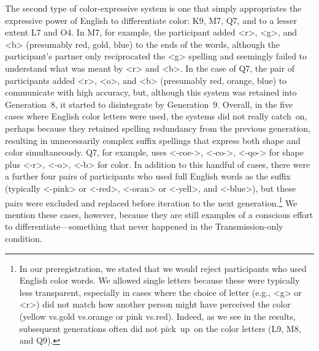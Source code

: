 \documentclass[doc,biblatex]{apa7}
\begin{document}
The second type of color-expressive system is one that simply appropriates the expressive power of English to differentiate color: K9, M7, Q7, and to a lesser extent L7 and O4. In M7, for example, the participant added <r>, <g>, and <b> (presumably red, gold, blue) to the ends of the words, although the participant's partner only reciprocated the <g> spelling and seemingly failed to understand what was meant by <r> and <b>. In the case of Q7, the pair of participants added <r>, <o>, and <b> (presumably red, orange, blue) to communicate with high accuracy, but, although this system was retained into Generation~8, it started to disintegrate by Generation~9. Overall, in the five cases where English color letters were used, the systems did not really catch~on, perhaps because they retained spelling redundancy from the previous generation, resulting in unnecessarily complex suffix spellings that express both shape and color simultaneously. Q7, for example, uses <-coe->, <-co->, <-qo-> for shape plus <-r>, <-o>, <-b> for color. In addition to this handful of cases, there were a further four pairs of participants who used full English words as the suffix (typically <-pink> or <-red>, <-oran> or <-yell>, and <-blue>), but these pairs were excluded and replaced before iteration to the next generation.\footnote{In our preregistration, we stated that we would reject participants who used English color words. We allowed single letters because these were typically less transparent, especially in cases where the choice of letter (e.g., <g> or <r>) did not match how another person might have perceived the color (yellow vs.\@ gold vs.\@ orange or pink vs.\@ red). Indeed, as we see in the results, subsequent generations often did not pick~up~on the color letters (L9, M8, and Q9).} We mention these cases, however, because they are still examples of a conscious effort to differentiate---something that never happened in the Transmission-only condition.
\end{document}
